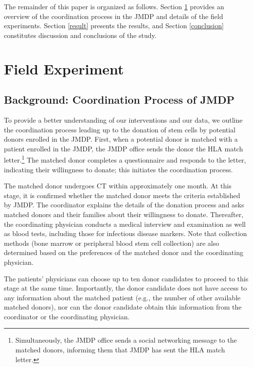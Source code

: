 \documentclass [12pt, a4paper]{article}
\begin{document}
The remainder of this paper is organized as follows. Section \ref{experiment} provides an overview of the coordination process in the JMDP and details of the field experiments. Section \ref{result} presents the results, and Section \ref{conclusion} constitutes discussion and conclusions of the study.

\hypertarget{experiment}{%
\section{Field Experiment}\label{experiment}}

\hypertarget{background}{%
\subsection{Background: Coordination Process of JMDP}\label{background}}

To provide a better understanding of our interventions and our data, we outline the coordination process leading up to the donation of stem cells by potential donors enrolled in the JMDP. First, when a potential donor is matched with a patient enrolled in the JMDP, the JMDP office sends the donor the HLA match letter.\footnote{Simultaneously, the JMDP office sends a social networking message to the matched donors, informing them that JMDP has sent the HLA match letter.} The matched donor completes a questionnaire and responds to the letter, indicating their willingness to donate; this initiates the coordination process.

The matched donor undergoes CT within approximately one month. At this stage, it is confirmed whether the matched donor meets the criteria established by JMDP. The coordinator explains the details of the donation process and asks matched donors and their families about their willingness to donate. Thereafter, the coordinating physician conducts a medical interview and examination as well as blood tests, including those for infectious disease markers. Note that collection methods (bone marrow or peripheral blood stem cell collection) are also determined based on the preferences of the matched donor and the coordinating physician.

The patients' physicians can choose up to ten donor candidates to proceed to this stage at the same time. Importantly, the donor candidate does not have access to any information about the matched patient (e.g., the number of other available matched donors), nor can the donor candidate obtain this information from the coordinator or the coordinating physician.
\end{document}
